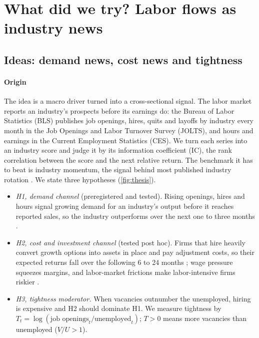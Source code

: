 \section{What did we try? Labor flows as industry news}

\subsection{Ideas: demand news, cost news and tightness}\label{sec:ideas}

\paragraph{Origin} The idea is a macro driver turned into a cross-sectional signal. The labor market reports an industry's prospects before its earnings do: the Bureau of Labor Statistics (BLS) publishes job openings, hires, quits and layoffs by industry every month in the Job Openings and Labor Turnover Survey (JOLTS), and hours and earnings in the Current Employment Statistics (CES). We turn each series into an industry score and judge it by its information coefficient (IC), the rank correlation between the score and the next relative return. The benchmark it has to beat is industry momentum, the signal behind most published industry rotation \citep{MoskowitzGrinblatt1999,ZarattiniAntonacci2024}. We state three hypotheses (\cref{fig:thesis}).

\begin{itemize}
  \item \emph{H1, demand channel} (preregistered and tested). Rising openings, hires and hours signal growing demand for an industry's output before it reaches reported sales, so the industry outperforms over the next one to three months \citep{HongTorousValkanov2007}.
  \item \emph{H2, cost and investment channel} (tested post hoc). Firms that hire heavily convert growth options into assets in place and pay adjustment costs, so their expected returns fall over the following 6 to 24 months \citep{BeloLinBazdresch2014}; wage pressure squeezes margins, and labor-market frictions make labor-intensive firms riskier \citep{KuehnSimutinWang2017,Donangelo2019}.
  \item \emph{H3, tightness moderator.} When vacancies outnumber the unemployed, hiring is expensive and H2 should dominate H1. We measure tightness by $T_t=\log(\text{job openings}_t/\text{unemployed}_t)$; $T>0$ means more vacancies than unemployed ($V/U>1$).
\end{itemize}

